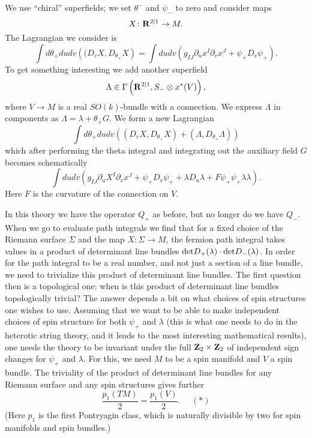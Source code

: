 We use ``chiral'' superfields; we 
set $\theta^-$ and  $\psi_-$ to zero and consider maps
$$X\colon {\bf R}^{2|1}\to M.$$
The Lagrangian we consider is
$$\int d\theta_+dudv\left((D_vX,D_{\theta_+}X\right)=\int
dudv\left(g_{IJ}\partial_u x^I\partial_v x^J+\psi_+D_v\psi_+\right).$$
To get something interesting we add another superfield 
$$\Lambda\in \Gamma\left({\bf R}^{2|1},S_-\otimes x^*(V)\right),$$
where $V\to M$ is a real $SO(k)$-bundle with a connection.
We express $\Lambda$ in components as $\Lambda=\lambda+\theta_+ G$.
We form a new Lagrangian
$$\int  d\theta_+dudv\left((D_vX,D_{\theta_+}X)
+(\Lambda,D_{\theta_+}\Lambda)\right)$$
which after performing the theta integral and integrating out the auxiliary
field $G$ becomes schematically
$$\int dudv\left(g_{IJ}\partial_u X^I\partial_v x^J+\psi_+D_v\psi_+
+\lambda D_u \lambda+F\psi_+\psi_+\lambda\lambda\right).$$
Here $F$ is the curvature of the connection on $V$.

In this theory we have the operator $Q_+$ as before, but no longer do
we have $Q_-$. When we go to evaluate path integrals we find that
for a fixed choice of the Riemann surface $\Sigma$ and the map $X:\Sigma
\to M$,  the fermion path integral takes values in a product of
determinant line bundles
${\rm det}D_+(\lambda)\cdot {\rm det}D_-(\lambda)$.
In order for the path integral to be a real number, and not just a
section of a line bundle, we need to trivialize this product of
determinant line bundles. The first question then is a topological
one: when is this product of determinant line bundles topologically
trivial?  The answer depends a bit on what choices of spin structures
one wishes to use.  Assuming that we want to be able to 
make independent choices
of spin structure for both $\psi_+$ and $\lambda$ (this is what one needs
to do in the heterotic string theory, and it leads to the most interesting
mathematical results), one needs the theory to be invariant under the
full ${\bf Z}_2\times {\bf Z}_2$ of independent sign changes for $\psi_+$
and $\lambda$.  For this, we need
$M$ to be a spin manifold and $V$ a spin
bundle.
The triviality of the product of determinant line bundles for any
Riemann surface and any spin structures gives further
$$\frac{p_1(TM)}{2}=\frac{p_1(V)}{2}.~~~~~~(*)$$
(Here $p_1$ is the first Pontryagin class, which is naturally divisible
by two for spin manifolds and spin bundles.)


